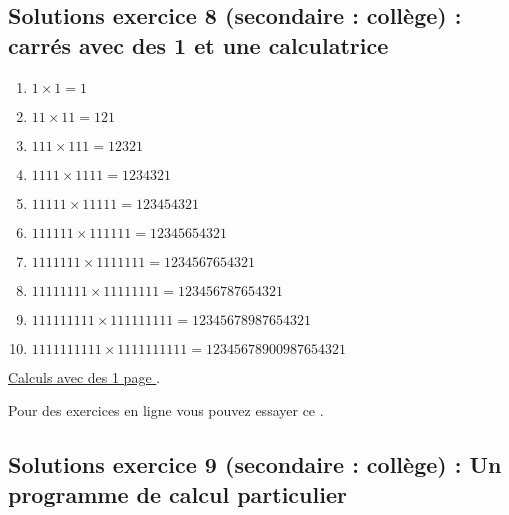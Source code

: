 \newpage


\subsection{Solutions exercice 8 (secondaire : collège) : carrés avec des 1 et une calculatrice}

\label{sol:niveau8}

\begin{enumerate}[label=C\arabic*)]
    \item \(1 \times 1 =  1\)
    \item \(11 \times 11 = 121\)
    \item \(111 \times 111 = 12321\)
    \item \(1111 \times 1111 = 1234321\)
    \item \(11111 \times 11111 = 123454321\)
    \item \(111111 \times 111111 = 12345654321\)
    \item \(1111111 \times 1111111 = 1234567654321\)
    \item \(11111111 \times 11111111 = 123456787654321\)
    \item \(111111111 \times 111111111 = 12345678987654321\)
    \item \(1111111111 \times 1111111111 = 12345678900987654321\)
\end{enumerate}

\hyperref[calc:niveau8]{Calculs avec des 1 page \pageref{calc:niveau8}}.

Pour des exercices en ligne vous pouvez essayer ce .


\newpage



\subsection{Solutions exercice 9 (secondaire : collège) : Un programme de calcul particulier}

\label{sol:niveau9}

